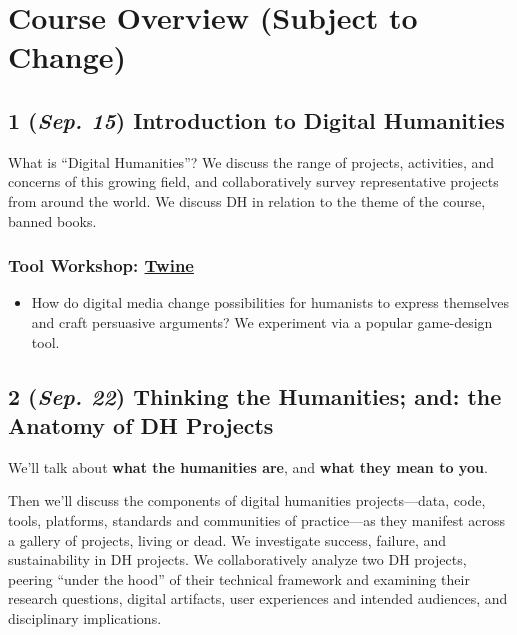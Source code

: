 \documentclass[11pt]{article}
\begin{document}
\section*{Course Overview (Subject to Change)}
\label{sec:orgc9c2513}
\subsection*{1 (\textit{Sep. 15}) Introduction to Digital Humanities}
\label{sec:org14d44ce}
What is “Digital Humanities”? We discuss the range of projects, activities, and concerns of this growing field, and collaboratively survey representative projects from around the world. We discuss DH in relation to the theme of the course, banned books. 

\subsubsection*{Tool Workshop: \href{https://twinery.org/}{Twine}}
\label{sec:orge00eccf}
\begin{itemize}
\item How do digital media change possibilities for humanists to express themselves and craft persuasive arguments? We experiment via a popular game-design tool.
\end{itemize}
\subsection*{2 (\textit{Sep. 22}) Thinking the Humanities; and: the Anatomy of DH Projects}
\label{sec:org94c375f}
We'll talk about \textbf{what the humanities are}, and \textbf{what they mean to you}. 

Then we'll discuss the components of digital humanities projects—data, code, tools, platforms, standards and communities of practice—as they manifest across a gallery of projects, living or dead. We investigate success, failure, and sustainability in DH projects. We collaboratively analyze two DH projects, peering “under the hood” of their technical framework and examining their research questions, digital artifacts, user experiences and intended audiences, and disciplinary implications.
\end{document}
